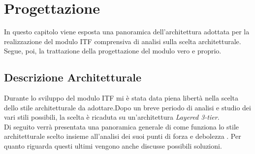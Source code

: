 
\chapter{Progettazione}
\label{cap:progettazione}
In questo capitolo viene esposta una panoramica dell'architettura adottata per la realizzazione del modulo \gls{ITF} comprensiva di analisi sulla scelta architetturale. Segue, poi, la trattazione della progettazione del modulo vero e proprio.\\
\section{Descrizione Architetturale}
Durante lo sviluppo del modulo \gls{ITF} mi è stata data piena libertà nella scelta dello stile architetturale da adottare.Dopo un breve periodo di analisi e studio dei vari stili possibili, la scelta è ricaduta su un'architettura \textit{Layered 3-tier}.\\
Di seguito verrà presentata una panoramica generale di come funziona lo stile architetturale scelto insieme all'analisi dei suoi punti di forza e debolezza \cite{3tierArch,3tierArch2}. Per quanto riguarda questi ultimi vengono anche discusse possibili soluzioni.\\
